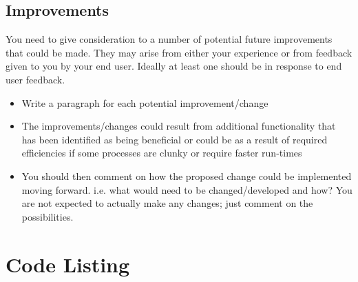 \documentclass[10pt]{article}
\begin{document}
\subsection{Improvements}

You need to give consideration to a number of potential future improvements that could be made. They may arise from either your experience or from feedback given to you by your end user. Ideally at least one should be in response to end user feedback.

\begin{itemize}
    \item Write a paragraph for each potential improvement/change
    \item The improvements/changes could result from additional functionality that has been identified as being beneficial or could be as a result of required efficiencies if some processes are clunky or require faster run-times
    \item You should then comment on how the proposed change could be implemented moving forward. i.e. what would need to be changed/developed and how? You are not expected to actually make any changes; just comment on the possibilities.
\end{itemize}

\section{Code Listing}
\end{document}
